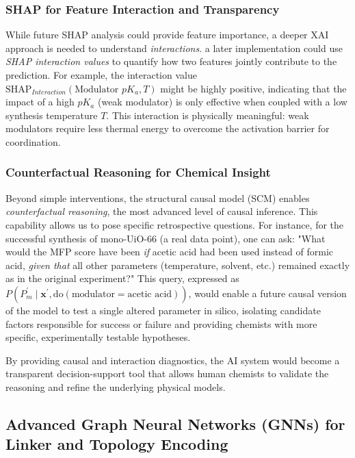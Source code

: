 \documentclass[12pt,a4paper]{article}
\begin{document}
\subsubsection{SHAP for Feature Interaction and Transparency}

While future SHAP analysis could provide feature importance, a deeper XAI approach is needed to understand \textit{interactions}. a later implementation could use \textit{SHAP interaction values} to quantify how two features jointly contribute to the prediction. For example, the interaction value $\text{SHAP}_{Interaction}(\text{Modulator } pK_a, T)$ might be highly positive, indicating that the impact of a high $pK_a$ (weak modulator) is only effective when coupled with a low synthesis temperature $T$. This interaction is physically meaningful: weak modulators require less thermal energy to overcome the activation barrier for coordination.

\subsubsection{Counterfactual Reasoning for Chemical Insight}

Beyond simple interventions, the structural causal model (SCM) enables \textit{counterfactual reasoning}, the most advanced level of causal inference. This capability allows us to pose specific retrospective questions. For instance, for the successful synthesis of mono-UiO-66 (a real data point), one can ask: "What would the MFP score have been \textit{if} acetic acid had been used instead of formic acid, \textit{given that} all other parameters (temperature, solvent, etc.) remained exactly as in the original experiment?" This query, expressed as $P(P_m^{'} \mid \mathbf{x}^{'}, \text{do}(\text{modulator}=\text{acetic acid}))$, would enable a future causal version of the model to test a single altered parameter in silico, isolating candidate factors responsible for success or failure and providing chemists with more specific, experimentally testable hypotheses.

By providing causal and interaction diagnostics, the AI system would become a transparent decision-support tool that allows human chemists to validate the reasoning and refine the underlying physical models.

\subsection{Advanced Graph Neural Networks (GNNs) for Linker and Topology Encoding}
\end{document}
